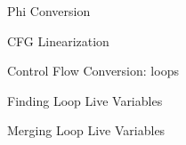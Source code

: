 
\begin{frame}{Phi Conversion}

\end{frame}


\begin{frame}{CFG Linearization}

\end{frame}


\begin{frame}{Control Flow Conversion: loops}

\end{frame}


\begin{frame}{Finding Loop Live Variables}

\end{frame}


\begin{frame}{Merging Loop Live Variables}

\end{frame}
